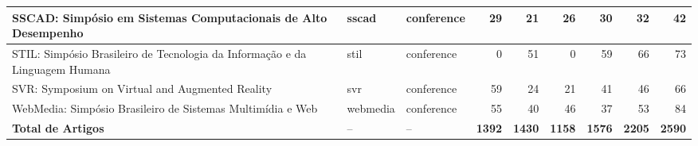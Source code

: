 \begin{table}[H]
\begin{tabular}{|p{10cm}|l|l|r|r|r|r|r|r|}
\hline
SSCAD: Simpósio em Sistemas Computacionais de Alto Desempenho & sscad & conference & 29 & 21 & 26 & 30 & 32 & 42 \\
\hline
STIL: Simpósio Brasileiro de Tecnologia da Informação e da Linguagem Humana & stil & conference & 0 & 51 & 0 & 59 & 66 & 73 \\
\hline
SVR: Symposium on Virtual and Augmented Reality & svr & conference & 59 & 24 & 21 & 41 & 46 & 66 \\
\hline
WebMedia: Simpósio Brasileiro de Sistemas Multimídia e Web & webmedia & conference & 55 & 40 & 46 & 37 & 53 & 84 \\
\hline
\textbf{Total de Artigos} & -- & -- & \textbf{1392} & \textbf{1430} & \textbf{1158} & \textbf{1576} & \textbf{2205} & \textbf{2590} \\
\hline
\end{tabular}
\end{table}






